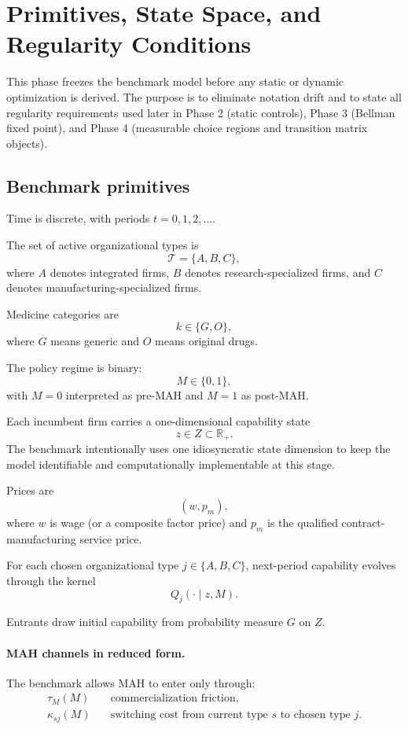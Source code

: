 \section{Primitives, State Space, and Regularity Conditions}

This phase freezes the benchmark model before any static or dynamic optimization is derived. The purpose is to eliminate notation drift and to state all regularity requirements used later in Phase 2 (static controls), Phase 3 (Bellman fixed point), and Phase 4 (measurable choice regions and transition matrix objects).

\subsection{Benchmark primitives}

Time is discrete, with periods $t=0,1,2,\dots$.

The set of active organizational types is
\[
\mathcal T=\{A,B,C\},
\]
where $A$ denotes integrated firms, $B$ denotes research-specialized firms, and $C$ denotes manufacturing-specialized firms.

Medicine categories are
\[
k\in\{G,O\},
\]
where $G$ means generic and $O$ means original drugs.

The policy regime is binary:
\[
M\in\{0,1\},
\]
with $M=0$ interpreted as pre-MAH and $M=1$ as post-MAH.

Each incumbent firm carries a one-dimensional capability state
\[
z\in Z\subset\mathbb R_+.
\]
The benchmark intentionally uses one idiosyncratic state dimension to keep the model identifiable and computationally implementable at this stage.

Prices are
\[
(w,p_m),
\]
where $w$ is wage (or a composite factor price) and $p_m$ is the qualified contract-manufacturing service price.

For each chosen organizational type $j\in\{A,B,C\}$, next-period capability evolves through the kernel
\[
Q_j(\cdot\mid z,M).
\]

Entrants draw initial capability from probability measure $G$ on $Z$.

\paragraph{MAH channels in reduced form.}
The benchmark allows MAH to enter only through:
\begin{align}
\tau_M(M) &\quad \text{commercialization friction},\\
\kappa_{sj}(M) &\quad \text{switching cost from current type } s \text{ to chosen type } j.
\end{align}

